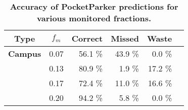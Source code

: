 \begin{table}[t!]
\begin{threeparttable}
{\small
\begin{tabularx}{\columnwidth}{Xrrrrr}
\multicolumn{1}{c}{\textbf{Type}} & 
\multicolumn{1}{c}{\textbf{$f_m$}} & 
\multicolumn{1}{c}{\textbf{Correct}} & 
\multicolumn{1}{c}{\textbf{Missed}} & 
\multicolumn{1}{c}{\textbf{Waste}}\\ \toprule

\textbf{Campus} & 0.07 & 56.1 \% & 43.9 \% & 0.0 \% \\
& 0.13 & 80.9 \% & 1.9 \% & 17.2 \% \\
& 0.17 & 72.4 \% & 11.0 \% & 16.6 \% \\
& 0.20 & 94.2 \% & 5.8 \% & 0.0 \% \\
\end{tabularx}
}
\caption{\textbf{Accuracy of PocketParker predictions for various monitored fractions.}}
\label{table-accuracy}
\end{threeparttable}
\end{table}
